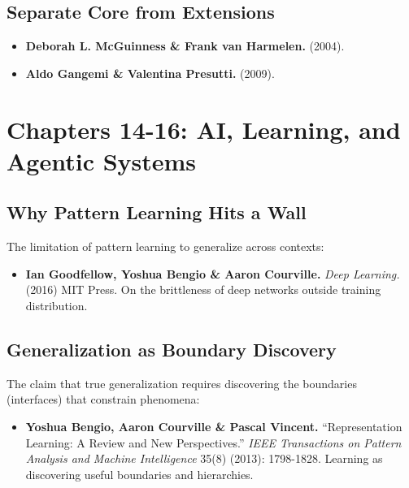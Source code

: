 \documentclass[
  openright]{book}
\providecommand{\tightlist}{%
  \setlength{\itemsep}{0pt}\setlength{\parskip}{0pt}}
\begin{document}
\subsection{Separate Core from
Extensions}\label{separate-core-from-extensions-1}

\begin{itemize}
\item
  \textbf{Deborah L. McGuinness \& Frank van Harmelen.} (2004).
\item
  \textbf{Aldo Gangemi \& Valentina Presutti.} (2009).
\end{itemize}

\section{Chapters 14-16: AI, Learning, and Agentic
Systems}\label{chapters-14-16-ai-learning-and-agentic-systems}

\subsection{Why Pattern Learning Hits a
Wall}\label{why-pattern-learning-hits-a-wall-1}

The limitation of pattern learning to generalize across contexts:

\begin{itemize}
\tightlist
\item
  \textbf{Ian Goodfellow, Yoshua Bengio \& Aaron Courville.} \emph{Deep
  Learning.} (2016) MIT Press. On the brittleness of deep networks
  outside training distribution.
\end{itemize}

\subsection{Generalization as Boundary
Discovery}\label{generalization-as-boundary-discovery-1}

The claim that true generalization requires discovering the boundaries
(interfaces) that constrain phenomena:

\begin{itemize}
\tightlist
\item
  \textbf{Yoshua Bengio, Aaron Courville \& Pascal Vincent.}
  ``Representation Learning: A Review and New Perspectives.'' \emph{IEEE
  Transactions on Pattern Analysis and Machine Intelligence} 35(8)
  (2013): 1798-1828. Learning as discovering useful boundaries and
  hierarchies.
\end{itemize}
\end{document}
